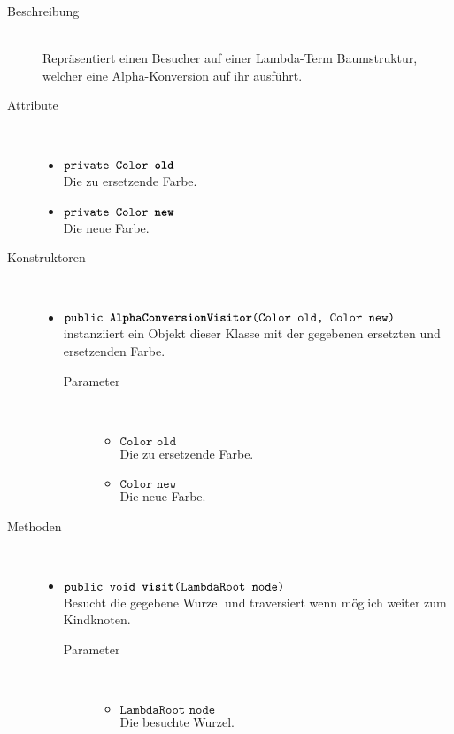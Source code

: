\begin{description}
\item[Beschreibung] \hfill \\ Repräsentiert einen Besucher auf einer Lambda-Term Baumstruktur, welcher eine Alpha-Konversion auf ihr ausführt.

\item[Attribute] \hfill \\
	\vspace{-.8cm}
	\begin{itemize}
		\item $\texttt{private Color \textbf{old}}$ \\ Die zu ersetzende Farbe.
		\item $\texttt{private Color \textbf{new}}$ \\ Die neue Farbe.
	\end{itemize}

\item[Konstruktoren] \hfill \\
	\vspace{-.8cm}
	\begin{itemize}
		\item $\texttt{public \textbf{AlphaConversionVisitor}(Color old, Color new)}$ \\ instanziiert ein Objekt dieser Klasse mit der gegebenen ersetzten und ersetzenden Farbe.
		\begin{description}
			\item[Parameter] \hfill \\
			\vspace{-.8cm}
			\begin{itemize}
				\item $\texttt{Color old}$ \\ Die zu ersetzende Farbe.
				\item $\texttt{Color new}$ \\ Die neue Farbe.
			\end{itemize}
		\end{description}
	\end{itemize}

\item[Methoden] \hfill \\
	\vspace{-.8cm}
	\begin{itemize}
		\item $\texttt{public void \textbf{visit}(LambdaRoot node)}$ \\ Besucht die gegebene Wurzel und traversiert wenn möglich weiter zum Kindknoten.
		\begin{description}
			\item[Parameter] \hfill \\
			\vspace{-.8cm}
			\begin{itemize}
				\item $\texttt{LambdaRoot node}$ \\ Die besuchte Wurzel.
			\end{itemize}
		\end{description}
			

\end{itemize}
\end{description}

